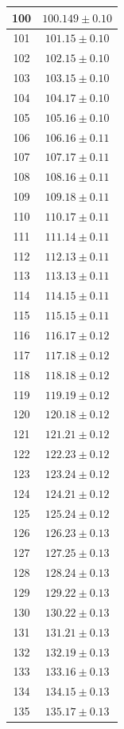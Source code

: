 \documentclass[prb,12pt]{revtex4-2}
\theoremstyle{definition}
\theoremstyle{definition}
\begin{document}
\begin{longtable}{cc}
100 & $100.149\pm 0.10$ \\\midrule
101 & $101.15\pm 0.10$ \\\midrule
102 & $102.15\pm 0.10$ \\\midrule
103 & $103.15\pm 0.10$ \\\midrule
104 & $104.17\pm 0.10$ \\\midrule
105 & $105.16\pm 0.10$ \\\midrule
106 & $106.16\pm 0.11$ \\\midrule
107 & $107.17\pm 0.11$ \\\midrule
108 & $108.16\pm 0.11$ \\\midrule
109 & $109.18\pm 0.11$ \\\midrule
110 & $110.17\pm 0.11$ \\\midrule
111 & $111.14\pm 0.11$ \\\midrule
112 & $112.13\pm 0.11$ \\\midrule
113 & $113.13\pm 0.11$ \\\midrule
114 & $114.15\pm 0.11$ \\\midrule
115 & $115.15\pm 0.11$ \\\midrule
116 & $116.17\pm 0.12$ \\\midrule
117 & $117.18\pm 0.12$ \\\midrule
118 & $118.18\pm 0.12$ \\\midrule
119 & $119.19\pm 0.12$ \\\midrule
120 & $120.18\pm 0.12$ \\\midrule
121 & $121.21\pm 0.12$ \\\midrule
122 & $122.23\pm 0.12$ \\\midrule
123 & $123.24\pm 0.12$ \\\midrule
124 & $124.21\pm 0.12$ \\\midrule
125 & $125.24\pm 0.12$ \\\midrule
126 & $126.23\pm 0.13$ \\\midrule
127 & $127.25\pm 0.13$ \\\midrule
128 & $128.24\pm 0.13$ \\\midrule
129 & $129.22\pm 0.13$ \\\midrule
130 & $130.22\pm 0.13$ \\\midrule
131 & $131.21\pm 0.13$ \\\midrule
132 & $132.19\pm 0.13$ \\\midrule
133 & $133.16\pm 0.13$ \\\midrule
134 & $134.15\pm 0.13$ \\\midrule
135 & $135.17\pm 0.13$ \\\midrule

\end{longtable}
\end{document}
